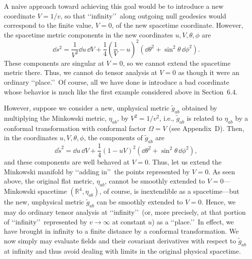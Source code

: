 A naive approach toward achieving this goal would be to introduce a new coordinate
\(V=1/v\), so that \lq\lq infinity\rq\rq\ along outgoing null geodesics would correspond to
the finite value, \(V=0\), of the new spacetime coordinate. However, the spacetime
metric components in the new coordinates \(u,V,\theta,\phi\) are
\begin{equation}
  \dd s^2=\frac{1}{V^2}\dd u\,\dd V
      +\frac14\left(\frac1V-u\right)^2(\dd\theta^2+\sin^2\theta\,\dd\phi^2).
  \tag{11.1.5}\label{eq:11.1.5}
\end{equation}
These components are singular at \(V=0\), so we cannot extend the spacetime metric
there. Thus, we cannot do tensor analysis at \(V=0\) as though it were an ordinary
\lq\lq place.\rq\rq\ Of course, all we have done is introduce a bad coordinate whose behavior
is much like the first example considered above in Section~6.4.

However, suppose we consider a new, unphysical metric \(\tilde g_{ab}\) obtained by
multiplying the Minkowski metric, \(\eta_{ab}\), by \(V^2=1/v^2\), i.e.,
\(\tilde g_{ab}\) is related to \(\eta_{ab}\) by a conformal transformation with conformal
factor \(\Omega=V\) (see Appendix~D). Then, in the coordinates
\(u,V,\theta,\phi\), the components of \(\tilde g_{ab}\) are
\begin{equation}
  \dd\tilde{s}^2=\dd u\,\dd V+\frac14(1-uV)^2(\dd\theta^2+\sin^2\theta\,\dd\phi^2),
  \tag{11.1.6}\label{eq:11.1.6}
\end{equation}
and these components are well behaved at \(V=0\). Thus, let us extend the
Minkowski manifold by \lq\lq adding in\rq\rq\ the points represented by \(V=0\). As seen
above, the original flat metric, \(\eta_{ab}\), cannot be smoothly extended to
\(V=0\)---Minkowski spacetime \((\mathbb R^4,\eta_{ab})\), of course, is
inextendible as a spacetime---but the new, unphysical metric \(\tilde g_{ab}\) can be
smoothly extended to \(V=0\). Hence, we may do ordinary tensor analysis at
\lq\lq infinity\rq\rq\ (or, more precisely, at that portion of \lq\lq infinity\rq\rq\ represented by
\(v\to\infty\) at constant \(u\)) as a \lq\lq place.\rq\rq\ In effect, we have brought in
infinity to a finite distance by a conformal transformation. We now simply may
evaluate fields and their covariant derivatives with respect to \(\tilde g_{ab}\) at
infinity and thus avoid dealing with limits in the original physical spacetime.

